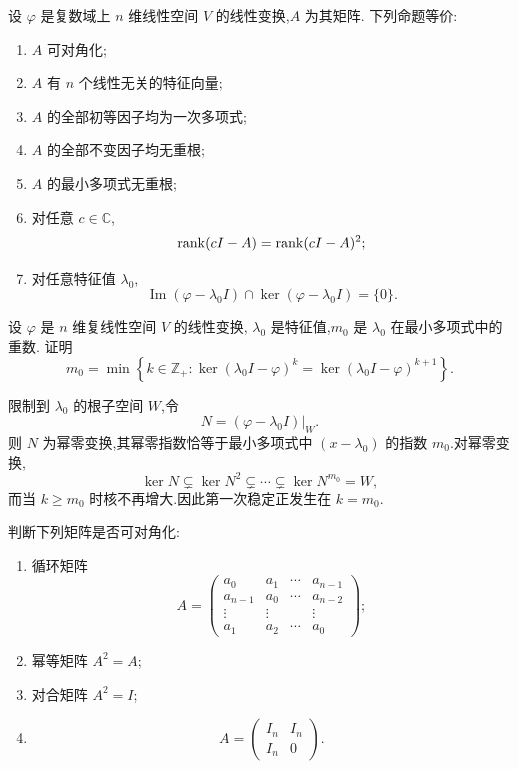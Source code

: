 \begin{proposition}[\marktwostar]
设 $\varphi$ 是复数域上 $n$ 维线性空间 $V$ 的线性变换,$A$ 为其矩阵.
下列命题等价:
\begin{enumerate}
    \item $A$ 可对角化;
    \item $A$ 有 $n$ 个线性无关的特征向量;
    \item $A$ 的全部初等因子均为一次多项式;
    \item $A$ 的全部不变因子均无重根;
    \item $A$ 的最小多项式无重根;
    \item 对任意 $c\in\mathbb{C}$,
    \[
    \operatorname{rank}(cI-A)=\operatorname{rank}(cI-A)^2;
    \]
    \item 对任意特征值 $\lambda_0$,
    \[
    \operatorname{Im}(\varphi-\lambda_0I)
    \cap
    \ker(\varphi-\lambda_0I)
    =
    \{0\}.
    \]
\end{enumerate}
\end{proposition}


\begin{example}[\markstar]
设 $\varphi$ 是 $n$ 维复线性空间 $V$ 的线性变换,
$\lambda_0$ 是特征值,$m_0$ 是 $\lambda_0$ 在最小多项式中的重数.
证明
\[
m_0
=
\min
\left\{
k\in\mathbb{Z}_+:
\ker(\lambda_0I-\varphi)^k
=
\ker(\lambda_0I-\varphi)^{k+1}
\right\}.
\]
\end{example}
\exampleblank

\begin{solution}
限制到 $\lambda_0$ 的根子空间 $W$,令
\[
N=(\varphi-\lambda_0I)|_W.
\]
则 $N$ 为幂零变换,其幂零指数恰等于最小多项式中
$(x-\lambda_0)$ 的指数 $m_0$.对幂零变换,
\[
\ker N\subsetneq\ker N^2\subsetneq\cdots\subsetneq\ker N^{m_0}=W,
\]
而当 $k\geq m_0$ 时核不再增大.因此第一次稳定正发生在 $k=m_0$.
\end{solution}


\begin{example}[\markstar]
判断下列矩阵是否可对角化:
\begin{enumerate}
    \item 循环矩阵
    \[
    A=
    \begin{pmatrix}
    a_0&a_1&\cdots&a_{n-1}\\
    a_{n-1}&a_0&\cdots&a_{n-2}\\
    \vdots&\vdots&&\vdots\\
    a_1&a_2&\cdots&a_0
    \end{pmatrix};
    \]
    \item 幂等矩阵 $A^2=A$;
    \item 对合矩阵 $A^2=I$;
    \item
    \[
    A=
    \begin{pmatrix}
    I_n&I_n\\
    I_n&0
    \end{pmatrix}.
    \]
\end{enumerate}
\end{example}
\exampleblank

